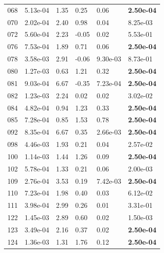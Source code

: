 \begin{figure}[htbp!]
{\begin{minipage}[t]{0.48\linewidth}
\begin{tabular}{llllll}
                    068 & 5.13e-04 & 1.35 & 0.25 & 0.06 & \textbf{2.50e-04}\\
                    070 & 2.02e-04 & 2.40 & 0.98 & 0.04 & 8.25e-03\\
                    072 & 5.60e-04 & 2.23 & -0.05 & 0.02 & 5.53e-01\\
                    076 & 7.53e-04 & 1.89 & 0.71 & 0.06 & \textbf{2.50e-04}\\
                    078 & 3.58e-03 & 2.91 & -0.06 & 9.30e-03 & 8.73e-01\\
                    080 & 1.27e-03 & 0.63 & 1.21 & 0.32 & \textbf{2.50e-04}\\
                    081 & 9.03e-04 & 6.67 & -0.35 & 7.23e-04 & \textbf{2.50e-04}\\
                    082 & 1.23e-03 & 2.24 & 0.02 & 0.02 & 3.02e-02\\
                    084 & 4.82e-04 & 0.94 & 1.23 & 0.33 & \textbf{2.50e-04}\\
                    085 & 7.28e-04 & 0.85 & 1.53 & 0.78 & \textbf{2.50e-04}\\
                    092 & 8.35e-04 & 6.67 & 0.35 & 2.66e-03 & \textbf{2.50e-04}\\
                    098 & 4.46e-03 & 1.93 & 0.21 & 0.04 & 2.57e-02\\
                    100 & 1.14e-03 & 1.44 & 1.26 & 0.09 & \textbf{2.50e-04}\\
                    102 & 5.78e-04 & 1.33 & 0.21 & 0.06 & 2.00e-03\\
                    109 & 2.76e-04 & 3.53 & 0.19 & 7.42e-03 & \textbf{2.50e-04}\\
                    110 & 7.23e-04 & 1.98 & 0.40 & 0.03 & 6.12e-02\\
                    111 & 3.98e-04 & 2.99 & 0.26 & 0.01 & 3.31e-01\\
                    122 & 1.45e-03 & 2.89 & 0.60 & 0.02 & 1.50e-03\\
                    123 & 3.49e-04 & 2.16 & 0.37 & 0.02 & \textbf{2.50e-04}\\
                    124 & 1.36e-03 & 1.31 & 1.76 & 0.12 & \textbf{2.50e-04}\\
        \bottomrule
        \end{tabular}
    \end{minipage}
    \hspace{0.02\linewidth}
    \begin{minipage}[t]{0.48\linewidth}
        \centering

\end{minipage}}
\end{figure}
